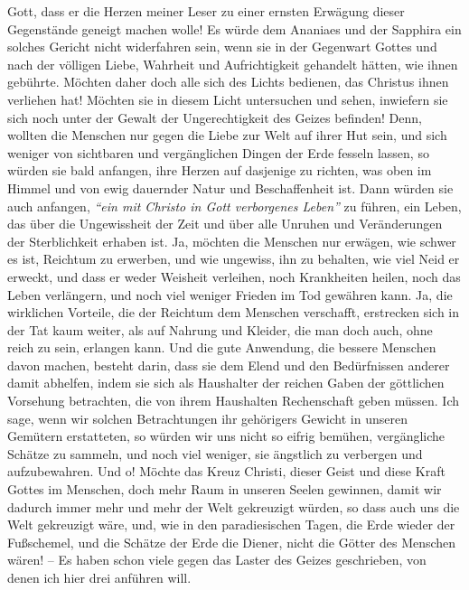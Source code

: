 Gott, dass er die Herzen meiner Leser zu einer ernsten Erwägung dieser
Gegenstände geneigt machen wolle! Es würde dem Ananiaes und der Sapphira ein
solches Gericht nicht widerfahren sein, wenn sie in der Gegenwart Gottes und
nach der völligen Liebe, Wahrheit und Aufrichtigkeit gehandelt hätten, wie ihnen
gebührte. Möchten daher doch alle sich des Lichts bedienen, das Christus ihnen
verliehen hat! Möchten sie in diesem Licht untersuchen und sehen, inwiefern
sie sich noch unter der Gewalt der Ungerechtigkeit des Geizes befinden! Denn,
wollten die Menschen nur gegen die Liebe zur Welt auf ihrer Hut sein, und sich
weniger von sichtbaren und vergänglichen Dingen der
Erde fesseln lassen, so
würden sie bald anfangen, ihre Herzen auf dasjenige zu richten, was oben im
Himmel und von ewig dauernder Natur und Beschaffenheit ist. Dann
würden sie auch
anfangen, \textit{"`ein mit Christo in Gott verborgenes Leben"'} zu führen, ein
Leben,
das über die Ungewissheit der Zeit und über alle Unruhen und Veränderungen der
Sterblichkeit erhaben ist. Ja, möchten die Menschen nur erwägen, wie schwer es
ist, Reichtum zu erwerben, und wie ungewiss, ihn zu behalten, wie viel
Neid er
erweckt, und dass er weder Weisheit verleihen, noch Krankheiten heilen, noch das
Leben verlängern, und noch viel weniger Frieden im Tod gewähren kann. Ja, die
wirklichen Vorteile, die der Reichtum dem Menschen verschafft, erstrecken sich
in der Tat kaum weiter, als auf Nahrung und Kleider, die man doch auch, ohne
reich zu sein, erlangen kann. Und die gute Anwendung, die bessere Menschen davon
machen, besteht darin, dass sie dem Elend und den Bedürfnissen anderer damit
abhelfen, indem sie sich als Haushalter der reichen Gaben der göttlichen
Vorsehung betrachten, die von ihrem Haushalten Rechenschaft geben müssen. Ich
sage, wenn wir solchen Betrachtungen ihr gehörigers Gewicht in unseren Gemütern
erstatteten, so würden wir uns nicht so eifrig bemühen, vergängliche Schätze zu
sammeln, und noch viel weniger, sie ängstlich zu verbergen und aufzubewahren. Und o!
Möchte das Kreuz Christi, dieser Geist und diese Kraft Gottes im Menschen, doch
mehr Raum in unseren Seelen gewinnen, damit wir dadurch immer mehr und mehr der
Welt gekreuzigt würden, so dass auch uns die Welt
gekreuzigt wäre, und, wie in
den paradiesischen Tagen, die Erde wieder der Fußschemel, und die Schätze der
Erde die Diener, nicht die Götter des Menschen wären! -- Es haben schon viele
gegen das Laster des Geizes geschrieben, von denen ich hier drei anführen will.

